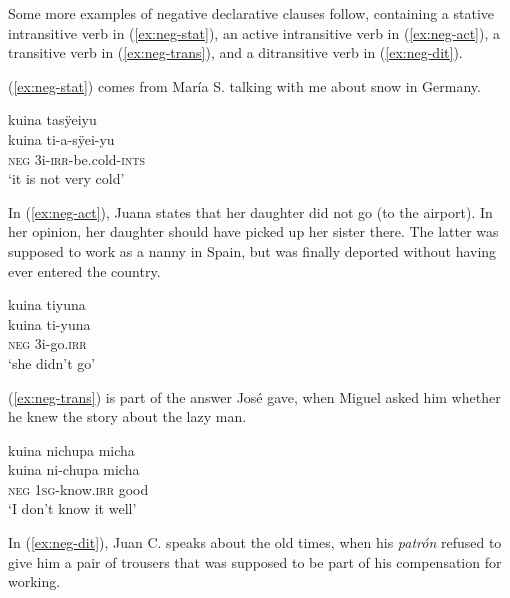 Some more examples of negative declarative clauses follow, containing a stative intransitive verb  in (\ref{ex:neg-stat}), an active intransitive verb in (\ref{ex:neg-act}), a transitive verb in (\ref{ex:neg-trans}), and a ditransitive verb in (\ref{ex:neg-dit}).

(\ref{ex:neg-stat}) comes from María S. talking with me about snow in Germany.

\ea\label{ex:neg-stat}
\begingl
\glpreamble kuina tasÿeiyu\\
\gla kuina ti-a-sÿei-yu\\
\glb \textsc{neg} 3i-\textsc{irr}-be.cold-\textsc{ints}\\
\glft ‘it is not very cold’
\endgl
\trailingcitation{[rxx-e120511l.312]}
\xe

%

In (\ref{ex:neg-act}), Juana states that her daughter did not go (to the airport). In her opinion, her daughter should have picked up her sister there. The latter was supposed to work as a nanny in Spain, but was finally deported without having ever entered the country.

\ea\label{ex:neg-act}
\begingl
\glpreamble kuina tiyuna\\
\gla kuina ti-yuna\\
\glb \textsc{neg} 3i-go.\textsc{irr}\\
\glft ‘she didn’t go’
\endgl
\trailingcitation{[jxx-p110923l-1.312]}
\xe

(\ref{ex:neg-trans}) is part of the answer José gave, when Miguel asked him whether he knew the story about the lazy man.

\ea\label{ex:neg-trans}
\begingl
\glpreamble kuina nichupa micha\\
\gla kuina ni-chupa micha\\
\glb \textsc{neg} 1\textsc{sg}-know.\textsc{irr} good\\
\glft ‘I don’t know it well’
\endgl
\trailingcitation{[mox-n110920l.007]}
\xe

In (\ref{ex:neg-dit}), Juan C. speaks about the old times, when his \textit{patrón} refused to give him a pair of trousers that was supposed to be part of his compensation for working.


